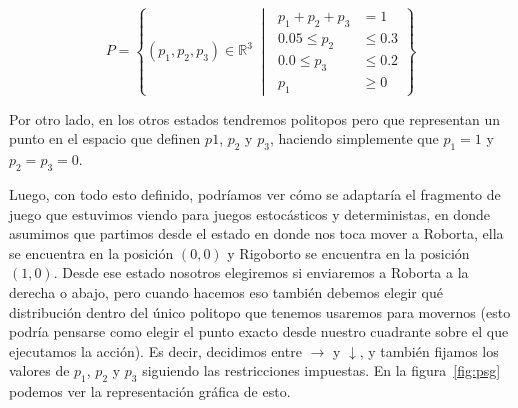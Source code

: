 \[
	P = \left\{ (p_1, p_2, p_3) \in \mathbb{R}^3 \;\middle|\;
	\begin{aligned}
		p_1 + p_2 + p_3 &= 1 \\
		0.05 \leq p_2 &\leq 0.3 \\
		0.0 \leq p_3 &\leq 0.2 \\
		p_1 &\geq 0
	\end{aligned}
	\right\}
\]

Por otro lado, en los otros estados tendremos politopos pero que representan un
punto en el espacio que definen $p1$, $p_2$ y $p_3$, haciendo simplemente que
$p_1 = 1$ y $p_2 = p_3 = 0$.

Luego, con todo esto definido, podríamos ver cómo se adaptaría el fragmento de
juego que estuvimos viendo para juegos estocásticos y deterministas, en donde
asumimos que partimos desde el estado en donde nos toca mover a Roborta, ella
se encuentra en la posición $(0,0)$ y Rigoborto se encuentra en la posición
$(1,0)$. Desde ese estado nosotros elegiremos si enviaremos a Roborta a la
derecha o abajo, pero cuando hacemos eso también debemos elegir qué
distribución dentro del único politopo que tenemos usaremos para movernos (esto
podría pensarse como elegir el punto exacto desde nuestro cuadrante sobre el
que ejecutamos la acción). Es decir, decidimos entre $\rightarrow$ y
$\downarrow$, y también fijamos los valores de $p_1$, $p_2$ y $p_3$ siguiendo
las restricciones impuestas. En la figura~\ref{fig:psg} podemos ver la
representación gráfica de esto.


